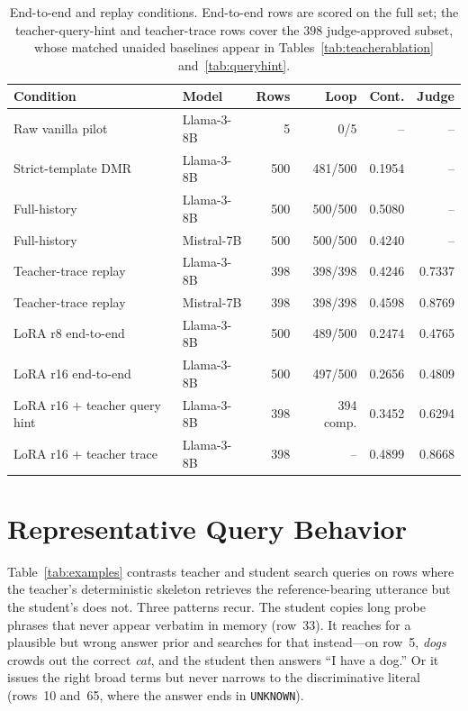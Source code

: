 \documentclass[11pt]{article}
\newcommand{\tool}[1]{\texttt{#1}}
\begin{document}
\begin{table}[t]
\centering
\small
\begin{tabular}{llrrrr}
\toprule
\textbf{Condition} & \textbf{Model} & \textbf{Rows} & \textbf{Loop} & \textbf{Cont.} & \textbf{Judge} \\
\midrule
Raw vanilla pilot & Llama-3-8B & 5 & 0/5 & -- & -- \\
Strict-template DMR & Llama-3-8B & 500 & 481/500 & 0.1954 & -- \\
Full-history & Llama-3-8B & 500 & 500/500 & 0.5080 & -- \\
Full-history & Mistral-7B & 500 & 500/500 & 0.4240 & -- \\
Teacher-trace replay & Llama-3-8B & 398 & 398/398 & 0.4246 & 0.7337 \\
Teacher-trace replay & Mistral-7B & 398 & 398/398 & 0.4598 & 0.8769 \\
LoRA r8 end-to-end & Llama-3-8B & 500 & 489/500 & 0.2474 & 0.4765 \\
LoRA r16 end-to-end & Llama-3-8B & 500 & 497/500 & 0.2656 & 0.4809 \\
LoRA r16 + teacher query hint & Llama-3-8B & 398 & 394 comp. & 0.3452 & 0.6294 \\
LoRA r16 + teacher trace & Llama-3-8B & 398 & -- & 0.4899 & 0.8668 \\
\bottomrule
\end{tabular}
\caption{End-to-end and replay conditions. End-to-end rows are scored on the full set; the teacher-query-hint and teacher-trace rows cover the $398$ judge-approved subset, whose matched unaided baselines appear in Tables~\ref{tab:teacherablation} and~\ref{tab:queryhint}.}
\label{tab:mainappendix}
\end{table}

\section{Representative Query Behavior}
\label{app:examples}

Table~\ref{tab:examples} contrasts teacher and student search queries on rows where the teacher's deterministic skeleton retrieves the reference-bearing utterance but the student's does not. Three patterns recur. The student copies long probe phrases that never appear verbatim in memory (row~33). It reaches for a plausible but wrong answer prior and searches for that instead---on row~5, \emph{dogs} crowds out the correct \emph{cat}, and the student then answers ``I have a dog.'' Or it issues the right broad terms but never narrows to the discriminative literal (rows~10 and~65, where the answer ends in \tool{UNKNOWN}).
\end{document}
